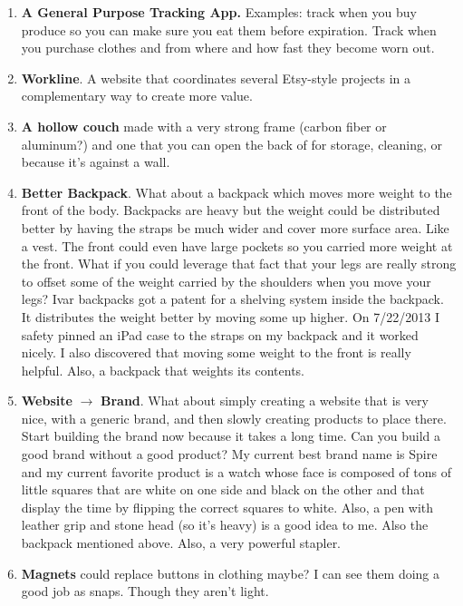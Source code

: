 \documentclass[paper=a4, fontsize=11pt]{scrartcl} %
\numberwithin{equation}{section} %
\numberwithin{figure}{section} %
\numberwithin{table}{section} %
\begin{document}
\begin{enumerate}
\item \textbf{A General Purpose Tracking App.}  Examples: track when you buy produce so you can make sure you eat them before expiration.  Track when you purchase clothes and from where and how fast they become worn out.  

\item \textbf{Workline}.  A website that coordinates several Etsy-style projects in a complementary way to create more value.

\item \textbf{A hollow couch} made with a very strong frame (carbon fiber or aluminum?) and one that you can open the back of for storage, cleaning, or because it's against a wall.  

\item  \textbf{Better Backpack}.  What about a backpack which moves more weight to the front of the body.  Backpacks are heavy but the weight could be distributed better by having the straps be much wider and cover more surface area.  Like a vest.  The front could even have large pockets so you carried more weight at the front.  What if you could leverage that fact that your legs are really strong to offset some of the weight carried by the shoulders when you move your legs?  Ivar backpacks got a patent for a shelving system inside the backpack.  It distributes the weight better by moving some up higher.  On 7/22/2013 I safety pinned an iPad case to the straps on my backpack and it worked nicely.  I also discovered that moving some weight to the front is really helpful.  Also, a backpack that weights its contents.

\item \textbf{Website} $\rightarrow$ \textbf{Brand}.  What about simply creating a website that is very nice, with a generic brand, and then slowly creating products to place there.  Start building the brand now because it takes a long time.  Can you build a good brand without a good product?  My current best brand name is Spire and my current favorite product is a watch whose face is composed of tons of little squares that are white on one side and black on the other and that display the time by flipping the correct squares to white.  Also, a pen with leather grip and stone head (so it's heavy) is a good idea to me.  Also the backpack mentioned above.  Also, a very powerful stapler.

\item \textbf{Magnets} could replace buttons in clothing maybe?  I can see them doing a good job as snaps.  Though they aren't light.  


\end{enumerate}
\end{document}
